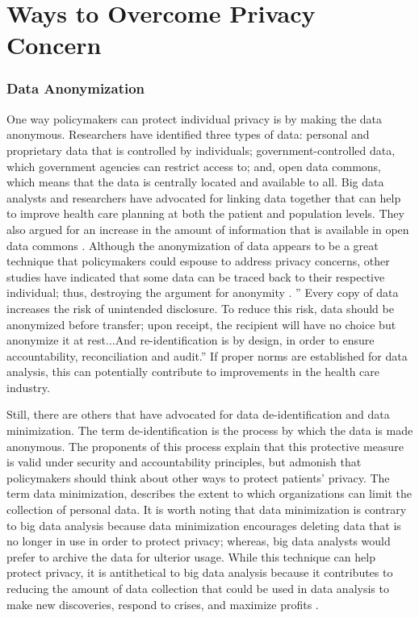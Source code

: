 \documentclass[sigconf]{acmart}
\begin{document}
\section{Ways to Overcome Privacy Concern}
\subsubsection{Data Anonymization}
One way policymakers can protect individual privacy is by making the data anonymous. Researchers have identified three types of data: personal and proprietary data that is controlled by individuals; government-controlled data, which government agencies can restrict access to; and, open data commons, which means that the data is centrally located and available to all. Big data analysts and researchers have advocated for linking data together that can help to improve health care planning at both the patient and population levels. They also argued for an increase in the amount of information that is available in open data commons \cite{roski2014creating}. Although the anonymization of data appears to be a great technique that policymakers could espouse to address privacy concerns, other studies have indicated that some data can be traced back to their respective individual; thus, destroying the argument for anonymity \cite{van2011health}. '' Every copy of data increases the risk of unintended disclosure. To reduce this risk, data should be anonymized before transfer; upon receipt, the recipient will have no choice but anonymize it at rest...And re-identification is by design, in order to ensure accountability, reconciliation and audit.'' If proper norms are established for data analysis, this can potentially contribute to improvements in the health care industry. 

Still, there are others that have advocated for data de-identification and data minimization. The term de-identification is the process by which the data is made anonymous. The proponents of this process explain that this protective measure is valid under security and accountability principles, but admonish that policymakers should think about other ways to protect patients' privacy. 
The term data minimization, describes the extent to which organizations can limit the collection of personal data. It is worth noting that data minimization is contrary to big data analysis because data minimization encourages deleting data that is no longer in use in order to protect privacy; whereas, big data analysts would prefer to archive the data for ulterior usage. While this technique can help protect privacy, it is antithetical to big data analysis because it contributes to reducing the amount of data collection that could be used in data analysis to make new discoveries, respond to crises, and maximize profits \cite{tene2012big}.
\end{document}

